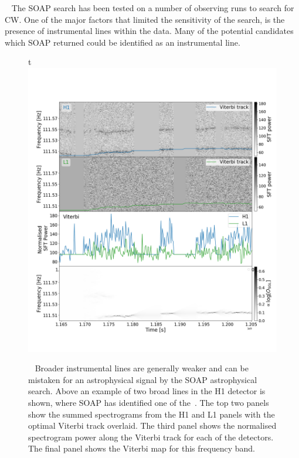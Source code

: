 % 
~ The SOAP search has been tested on a number of observing runs
to search for \gls{CW}.  One of the major factors that limited the sensitivity
of the search, is the presence of instrumental lines within the data.  Many of
the potential candidates which SOAP returned could be identified as an
instrumental line.
%
\begin{figure}[h]t
	\includegraphics[width=\textwidth]{C5_detchar/plot_F111_5_wandering_line.png}
        \caption[Broad wandering line example.]{~ Broader
			instrumental lines are generally weaker and can be mistaken for an
			astrophysical signal by the SOAP astrophysical search. Above an example of two
			broad lines in the H1 detector is shown, where SOAP has identified one of
			the~.
			The top two panels show the summed spectrograms from the H1 and L1 panels with
			the optimal Viterbi track overlaid. The third panel shows the normalised
			spectrogram power along the Viterbi track for each of the detectors. The final
			panel shows the Viterbi map for this frequency band.~
			}
\label{detchar:soap:astrowander}

\end{figure}
